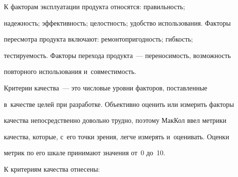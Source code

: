      

     К факторам эксплуатации продукта относятся: пра\-виль\-ность; 

на\-деж\-ность; эф\-фек\-тив\-ность; це\-лост\-ность; удоб\-ст\-во использования. Факторы 

пе\-ре\-смот\-ра продукта включают: ре\-мон\-то\-при\-год\-ность; гиб\-кость; 

тес\-ти\-ру\-емость. Факторы перехода продукта~--- переносимость, воз\-мож\-ность 

повторного использования и~со\-вмес\-ти\-мость.

     

     Критерии качества~--- это числовые уровни факторов, поставленные 

в~качестве целей при разработке. Объективно оценить или измерить факторы 

качества непосредственно довольно трудно, поэтому МакКол ввел метрики 

качества, которые, с~его точ\-ки зрения, лег\-че измерять и~оценивать. Оценки 

метрик по его шкале принимают значения от~0 до~10. 

     

     К критериям качества отнесены:

